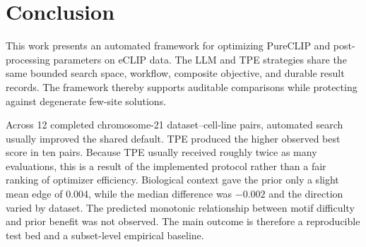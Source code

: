 \section{Conclusion}
\label{conclusion}

This work presents an automated framework for optimizing PureCLIP and
post-processing parameters on eCLIP data. The LLM and TPE strategies share the
same bounded search space, workflow, composite objective, and durable result
records. The framework thereby supports auditable comparisons while protecting
against degenerate few-site solutions.

Across 12 completed chromosome-21 dataset--cell-line pairs, automated search
usually improved the shared default. TPE produced the higher observed best score
in ten pairs. Because TPE usually
received roughly twice as many evaluations, this is a result of the implemented
protocol rather than a fair ranking of optimizer efficiency. Biological context
gave the prior only a slight mean edge of 0.004, while the median difference was
$-0.002$ and the direction varied by dataset. The predicted monotonic relationship
between motif difficulty and prior benefit was not observed. The main outcome is therefore a
reproducible test bed and a subset-level empirical baseline.
